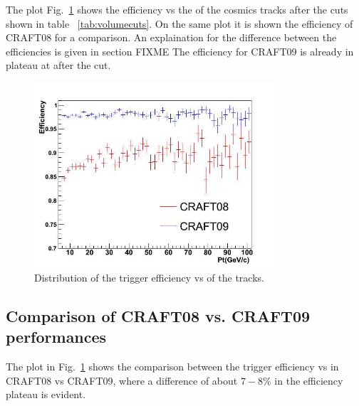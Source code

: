 The plot Fig.~\ref{fig:eff_pt_09_vs_08} shows the efficiency vs the
\pt of the cosmics tracks after the cuts shown in table
~\ref{tab:volumecuts}. On the same plot it is shown 
the efficiency of CRAFT08 for a comparison.
An explaination for the difference between the efficiencies
is given in section FIXME 
The efficiency for CRAFT09 is already in plateau at after the cut.

\begin{figure}[hbtp]
  \begin{center}
    \includegraphics[width=0.8\textwidth]{eff_pt_09_vs_08}
    \hspace{1cm}
    \caption{Distribution of the trigger efficiency vs \pt of the tracks.}
    \label{fig:eff_pt_09_vs_08}
  \end{center}
\end{figure}

\subsection{Comparison of CRAFT08 vs. CRAFT09 performances}
The plot in Fig.~\ref{fig:eff_pt_09_vs_08} shows the comparison between 
the trigger efficiency vs \pt in CRAFT08 vs CRAFT09, where a difference
of about $7-8 \% $ in the efficiency plateau is evident.

